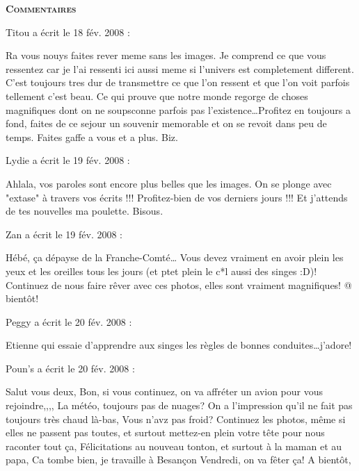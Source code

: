 \bigskip
\textbf{\textsc{Commentaires}}

\medskip
Titou a écrit le 18 fév. 2008 :
\begin{displayquote}
Ra vous nouys faites rever meme sans les images. Je comprend ce que vous ressentez car je l'ai ressenti ici aussi meme si l'univers est completement different. C'est toujours tres dur de transmettre ce que l'on ressent et que l'on voit parfois tellement c'est beau. Ce qui prouve que notre monde regorge de choses magnifiques dont on ne soupsconne parfois pas l'existence\dots Profitez en toujours a fond, faites de ce sejour un souvenir memorable et on se revoit dans peu de temps. Faites gaffe a vous et a plus. Biz.
\end{displayquote}

\medskip
Lydie a écrit le 19 fév. 2008 :
\begin{displayquote}
Ahlala, vos paroles sont encore plus belles que les images. On se plonge avec "extase" à travers vos écrits !!!
Profitez-bien de vos derniers jours !!! Et j'attends de tes nouvelles ma poulette. Bisous.
\end{displayquote}

\medskip
Zan a écrit le 19 fév. 2008 :
\begin{displayquote}
Hébé, ça dépayse de la Franche-Comté\dots
Vous devez vraiment en avoir plein les yeux et les oreilles tous les jours (et ptet plein le c*l aussi des singes :D)!
Continuez de nous faire rêver avec ces photos, elles sont vraiment magnifiques!
@ bientôt!
\end{displayquote}

\medskip
Peggy a écrit le 20 fév. 2008 :
\begin{displayquote}
Etienne qui essaie d'apprendre aux singes les règles de bonnes conduites\dots j'adore!
\end{displayquote}

\medskip
Poun's a écrit le 20 fév. 2008 :
\begin{displayquote}
Salut vous deux, Bon, si vous continuez, on va affréter un avion pour vous rejoindre,,,,
La météo, toujours pas de nuages? On a l'impression qu'il ne fait pas toujours très chaud là-bas, Vous n'avz pas froid?
Continuez les photos, même si elles ne passent pas toutes, et surtout mettez-en plein votre tête pour nous raconter tout ça,
Félicitations au nouveau tonton, et surtout à la maman et au papa,
Ca tombe bien, je travaille à Besançon Vendredi, on va fêter ça!
A bientôt,
\end{displayquote}

